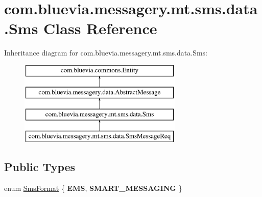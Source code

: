 \hypertarget{classcom_1_1bluevia_1_1messagery_1_1mt_1_1sms_1_1data_1_1Sms}{
\section{com.bluevia.messagery.mt.sms.data.Sms Class Reference}
\label{classcom_1_1bluevia_1_1messagery_1_1mt_1_1sms_1_1data_1_1Sms}
}
Inheritance diagram for com.bluevia.messagery.mt.sms.data.Sms:\begin{figure}[H]
\begin{center}
\leavevmode
\includegraphics[height=4.000000cm]{classcom_1_1bluevia_1_1messagery_1_1mt_1_1sms_1_1data_1_1Sms}
\end{center}
\end{figure}
\subsection*{Public Types}
\begin{DoxyCompactItemize}
\item 
enum \hyperlink{classcom_1_1bluevia_1_1messagery_1_1mt_1_1sms_1_1data_1_1Sms_ac0c19da99a0281e088f8eac81ed4efbe}{SmsFormat} \{ {\bfseries EMS}, 
{\bfseries SMART\_\-MESSAGING}
 \}
\end{DoxyCompactItemize}
